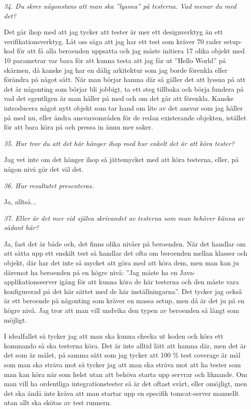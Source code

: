 \documentclass[11pt]{article}
\begin{document}
\emph{34. Du skrev någonstans att man ska ”lyssna” på testerna. Vad menar du med det?}

Det går ihop med att jag tycker att tester är mer ett designverktyg än ett verifikationsverktyg. Låt oss säga att jag har ett test som kräver 70 rader setup-kod för att få alla beroenden uppsatta och jag måste initiera 17 olika objekt med 10 parametrar var bara för att kunna testa att jag får ut ”Hello World” på skärmen, då kanske jag har en dålig arkitektur som jag borde förenkla eller förändra på något sätt. När man börjar hamna där så gäller det att lyssna på att det är någonting som börjar bli jobbigt, ta ett steg tillbaka och börja fundera på vad det egentligen är man håller på med och om det går att förenkla. Kanske introducera något nytt objekt som tar hand om lite av det ansvar som jag håller på med nu, eller ändra ansvarsområden för de redan existerande objekten, istället för att bara köra på och pressa in ännu mer saker.

\emph{35. Hur tror du att det här hänger ihop med hur enkelt det är att köra tester?}

Jag vet inte om det hänger ihop så jättemycket med att köra testerna, eller, på någon nivå gör det väl det.

\emph{36. Hur resultatet presenteras.}

Ja, alltså...

\emph{37. Eller är det mer vid själva skrivandet av testerna som man behöver känna av sådant här?}

Ja, fast det är både och, det finns olika nivåer på beroenden. När det handlar om att sätta upp ett enskilt test så handlar det ofta om beroenden mellan klasser och objekt, där har det inte så mycket att göra med att köra dem, men man kan ju däremot ha beroenden på en högre nivå: ”Jag måste ha en Java-applikationsserver igång för att kunna köra de här testerna och den måste vara konfigurerad på det här sättet med de här inställningarna”. Det tycker jag också är ett beroende på någonting som kräver en massa setup, men då är det ju på en högre nivå. Jag tror att man vill undvika den typen av beroenden så långt som möjligt.

I idealfallet så tycker jag att man ska kunna checka ut koden och köra ett kommando så ska testerna köra. Det är inte alltid lätt att hamna där, men det är det som är målet, på samma sätt som jag tycker att 100 \% test coverage är mål som man ska sträva mot så tycker jag att man ska sträva mot att ha tester som man kan köra när som helst utan att behöva starta upp servrar och liknande. Om man vill ha ordentliga integrationstester så är det oftast svårt, eller omöjligt, men det ska ändå inte kräva att man startar upp en specifik tomcat-server manuellt utan allt ska skötas av test runnern.
\end{document}
